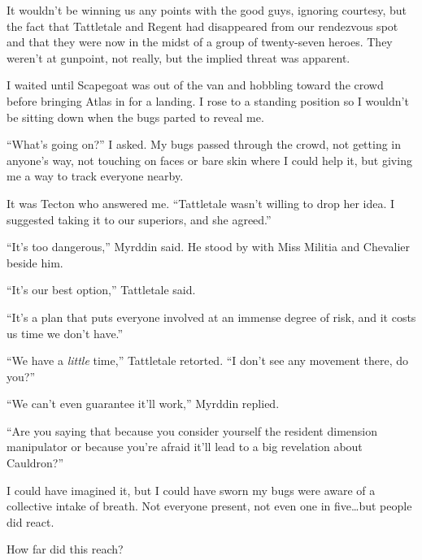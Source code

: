 It wouldn't be winning us any points with the good guys, ignoring courtesy, but the fact that Tattletale and Regent had disappeared from our rendezvous spot and that they were now in the midst of a group of twenty-seven heroes.  They weren't at gunpoint, not really, but the implied threat was apparent.



I waited until Scapegoat was out of the van and hobbling toward the crowd before bringing Atlas in for a landing.  I rose to a standing position so I wouldn't be sitting down when the bugs parted to reveal me.



``What's going on?'' I asked.  My bugs passed through the crowd, not getting in anyone's way, not touching on faces or bare skin where I could help it, but giving me a way to track everyone nearby.



It was Tecton who answered me.  ``Tattletale wasn't willing to drop her idea.  I suggested taking it to our superiors, and she agreed.''



``It's too dangerous,'' Myrddin said.  He stood by with Miss Militia and Chevalier beside him.



``It's our best option,'' Tattletale said.



``It's a plan that puts everyone involved at an immense degree of risk, and it costs us time we don't have.''



``We have a \emph{little} time,'' Tattletale retorted.  ``I don't see any movement there, do you?''



``We can't even guarantee it'll work,'' Myrddin replied.



``Are you saying that because you consider yourself the resident dimension manipulator or because you're afraid it'll lead to a big revelation about Cauldron?''



I could have imagined it, but I could have sworn my bugs were aware of a collective intake of breath.  Not everyone present, not even one in five\ldots but people did react.



How far did this reach?



